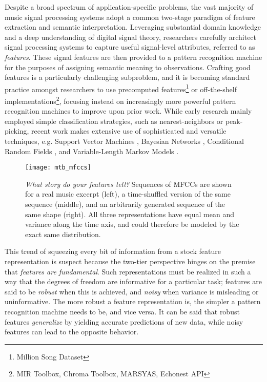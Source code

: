 Despite a broad spectrum of application-specific problems, the vast majority of music signal processing systems adopt a common two-stage paradigm of feature extraction and semantic interpretation.
Leveraging substantial domain knowledge and a deep understanding of digital signal theory, researchers carefully architect signal processing systems to capture useful signal-level attributes, referred to as \emph{features}.
These signal features are then provided to a pattern recognition machine for the purposes of assigning semantic meaning to observations.
Crafting good features is a particularly challenging subproblem, and it is becoming standard practice amongst researchers to use precomputed features\footnote{Million Song Dataset} or off-the-shelf implementations\footnote{MIR Toolbox, Chroma Toolbox, MARSYAS, Echonest API}, focusing instead on increasingly more powerful pattern recognition machines to improve upon prior work.
While early research mainly employed simple classification strategies, such as nearest-neighbors or peak-picking, recent work makes extensive use of sophisticated and versatile techniques, e.g. Support Vector Machines \cite{Mandel2005Song}, Bayesian Networks \cite{Mauch2010Approximate}, Conditional Random Fields \cite{Sumi2012Music}, and Variable-Length Markov Models \cite{Chordia2011Predictive}.
\begin{figure}
\begin{centering}
\texttt{[image: mtb\_mfccs]}
\caption{\emph{What story do your features tell?} Sequences of MFCCs are shown for a real music excerpt (left), a time-shuffled version of the same sequence (middle), and an arbitrarily generated sequence of the same shape (right). All three representations have equal mean and variance along the time axis, and could therefore be modeled by the exact same distribution.}
\label{fig:mfccs}
\end{centering}
\end{figure}

This trend of squeezing every bit of information from a stock feature representation is suspect because the two-tier perspective hinges on the premise that \emph{features are fundamental}.
Such representations must be realized in such a way that the degrees of freedom are informative for a particular task; features are said to be \emph{robust} when this is achieved, and \emph{noisy} when variance is misleading or uninformative.
The more robust a feature representation is, the simpler a pattern recognition machine needs to be, and vice versa.
It can be said that robust features \emph{generalize} by yielding accurate predictions of new data, while noisy features can lead to the opposite behavior.

